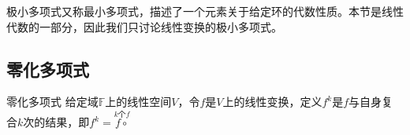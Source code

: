 



极小多项式又称最小多项式，描述了一个元素关于给定环的代数性质。本节是线性代数的一部分，因此我们只讨论线性变换的极小多项式。


\subsection{零化多项式}


\begin{definition}{零化多项式}
给定域$\mathbb{F}$上的线性空间$V$，令$f$是$V$上的线性变换，定义$f^k$是$f$与自身复合$k$次的结果，即$f^k=\overset{k\text{个}f}{f\circ }$
\end{definition}



























